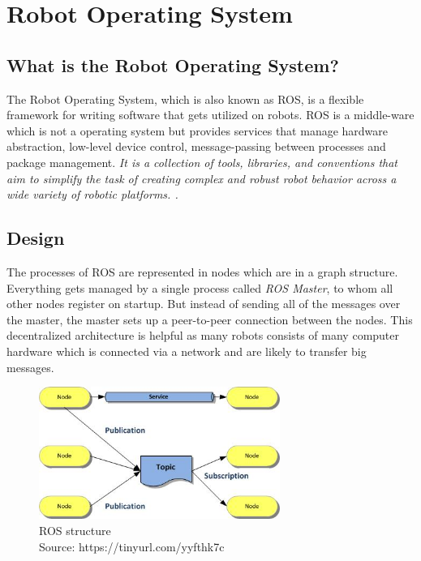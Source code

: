 
\chapter{Robot Operating System\authorA}

\section{What is the Robot Operating System?}
The Robot Operating System, which is also known as ROS, is a flexible framework for writing software that gets utilized on robots. ROS is a middle-ware which is not a operating system but provides services that manage hardware abstraction, low-level device control, message-passing between processes and package management. \emph{\glqq It is a collection of tools, libraries, and conventions that aim to simplify the task of creating complex and robust robot behavior across a wide variety of robotic platforms. .\grqq}~\cite{aboutros}

\section{Design}
The processes of ROS are represented in nodes which are in a graph structure. Everything gets managed by a single process called \textit{ROS Master}, to whom all other nodes register on startup. But instead of sending all of the messages over the master, the master sets up a peer-to-peer connection between the nodes. This decentralized architecture is helpful as many robots consists of many computer hardware which is connected via a network and are likely to transfer big messages. \cite{rosoneoone}   \\
\begin{figure}[h]
	\centering
	\includegraphics[width=0.7\textwidth]{./media/images/ros_structure.jpg}
  	\caption{ROS structure
  	\\Source: https://tinyurl.com/yyfthk7c}
  	\label{rosstructure}
\end{figure}

